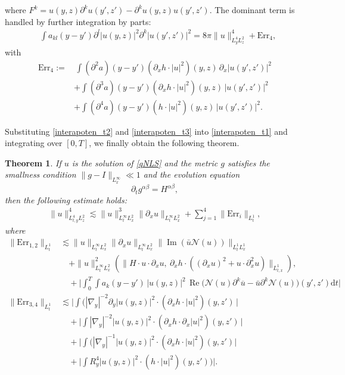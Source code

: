 \documentclass[11pt,letterpaper,reqno]{amsart}
\numberwithin{equation}{section}
\newtheorem{theorem}{Theorem}[section]
\theoremstyle{definition}
\theoremstyle{remark}
\newcommand{\pa}{\partial}
\begin{document}
where $F^k = u(y,z) \pa^k u(y',z')-\pa^k u(y,z) u(y',z') $.
The dominant term is handled by further integration by parts:
\begin{align}
	 &\int a_{kl }(y-y') \pa^l|u(y,z)|^2 \pa^k|u(y',z')|^2 
	  =  8\pi \|u\|_{L^4_y L^2_z}^4 + \text{Err}_4, \label{interapoten_t3}
\end{align}
with
\begin{align*}
   \text{Err}_4:=& \,\int (\pa^2 a)(y-y')( \pa_x h \cdot |u|^2 )(y,z)\, \pa_x|u(y',z')|^2  \nonumber\\
	 & + \int (\pa^3 a)(y-y')( \pa_x h \cdot |u|^2 )(y,z)\,  |u(y',z')|^2 \nonumber\\
	 & + \int (\pa^4 a)(y-y')(   h \cdot |u|^2 )(y,z)\,  |u(y',z')|^2.
\end{align*}

Substituting \eqref{interapoten_t2} and \eqref{interapoten_t3} into \eqref{interapoten_t1} and integrating over \([0,T]\), we finally obtain the following theorem.
\begin{theorem}  \label{thm_im}
	If  $ u $ is the solution of \eqref{qNLS} and the metric $g$ satisfies the smallness condition $\|g-I\|_{L^\infty_x}\ll 1$ and the evolution equation 
	\begin{equation}
	  \pa_t g^{\alpha \beta} = H^{\alpha \beta},
	\end{equation}
	 then the following estimate holds:
	\begin{align}
	\|u\|_{L^4_{t,y}L^2_z}^4 \lesssim \|u\|_{L^\infty_t L^2_x}^3  \|\pa_x u\|_{L^\infty_t L^2_x} + \sum_{j = 1}^4 \|\mathrm{Err}_i\|_{L^1_t},
	\end{align}
	where
    \begin{align}
		\|\mathrm{Err}_{1,2}\|_{L^1_t}&\lesssim \|u\|_{L^\infty_t L^2_x}   \|\pa_x u\|_{L^\infty_t L^2_x} \|\operatorname{Im}(\bar{u}\mathcal{N}(u))\|_{L^1_t L^1_x}\\
		&\quad + \|u\|_{L^\infty_t L^2_x}^2(\|   H \cdot u \cdot \pa_x u,\  \pa_x h \cdot( (\pa_x u)^2+ u\cdot \pa_x^2 u)\|_{L^1_{t,x}}),\nonumber\\
        &\quad+ \Big| \int_0^T\int a_k(y-y')\,   |u(y,z)|^2 \, \operatorname{Re}\big(\mathcal{N}(u)\partial^k \overline{u} - \bar{u} \partial^k\mathcal{N}(u)\big)(y',z')  \mathrm{d} t\Big|\nonumber\\
		\|\mathrm{Err}_{3,4}\|_{L^1_t}&\lesssim   \Big|\int(|\nabla_y|^{-2}\pa_y  |u(y,z)|^2  \cdot (\pa_x h \cdot |u|^2)(y,z')\, \Big|\nonumber\\
		&\quad    +\Big|\int   |\nabla_y|^{-2} |u(y,z)|^2 \cdot (\pa_x h  \cdot \pa_x|u|^2)(y,z')\, \Big|   \nonumber\\
	&\quad    + \Big|\int(|\nabla_y|^{-1}|u(y,z)|^2 \cdot( \pa_x h  \cdot |u|^2)(y,z')\Big|\nonumber\\
	&\quad  + \Big|  \int R^4_y |u(y,z)|^2 \cdot (h  \cdot|u|^2)(y,z'))\Big| \nonumber.
\end{align}
\end{theorem}
\end{document}
